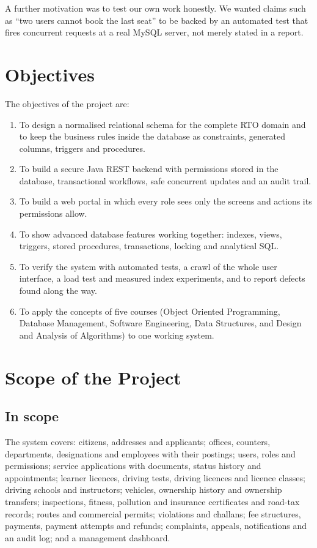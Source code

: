 A further motivation was to test our own work honestly. We wanted claims such as ``two
users cannot book the last seat'' to be backed by an automated test that fires
concurrent requests at a real MySQL server, not merely stated in a report.

\section{Objectives}
The objectives of the project are:
\begin{enumerate}
\item To design a normalised relational schema for the complete RTO domain and to keep the business rules inside the database as constraints, generated columns, triggers and procedures.
\item To build a secure Java REST backend with permissions stored in the database, transactional workflows, safe concurrent updates and an audit trail.
\item To build a web portal in which every role sees only the screens and actions its permissions allow.
\item To show advanced database features working together: indexes, views, triggers, stored procedures, transactions, locking and analytical SQL.
\item To verify the system with automated tests, a crawl of the whole user interface, a load test and measured index experiments, and to report defects found along the way.
\item To apply the concepts of five courses (Object Oriented Programming, Database Management, Software Engineering, Data Structures, and Design and Analysis of Algorithms) to one working system.
\end{enumerate}

\section{Scope of the Project}
\subsection{In scope}
The system covers: citizens, addresses and applicants; offices, counters, departments,
designations and employees with their postings; users, roles and permissions; service
applications with documents, status history and appointments; learner licences,
driving tests, driving licences and licence classes; driving schools and instructors;
vehicles, ownership history and ownership transfers; inspections, fitness, pollution
and insurance certificates and road-tax records; routes and commercial permits;
violations and challans; fee structures, payments, payment attempts and refunds;
complaints, appeals, notifications and an audit log; and a management dashboard.

